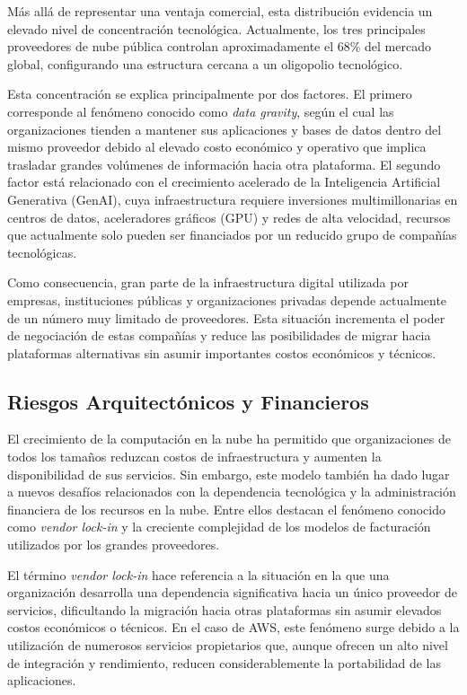 \documentclass[12pt,a4paper]{article}
\begin{document}
Más allá de representar una ventaja comercial, esta distribución evidencia un elevado nivel de concentración tecnológica. Actualmente, los tres principales proveedores de nube pública controlan aproximadamente el 68\% del mercado global, configurando una estructura cercana a un oligopolio tecnológico.\parencite{synergy2026}

Esta concentración se explica principalmente por dos factores. El primero corresponde al fenómeno conocido como \textit{data gravity}, según el cual las organizaciones tienden a mantener sus aplicaciones y bases de datos dentro del mismo proveedor debido al elevado costo económico y operativo que implica trasladar grandes volúmenes de información hacia otra plataforma. El segundo factor está relacionado con el crecimiento acelerado de la Inteligencia Artificial Generativa (GenAI), cuya infraestructura requiere inversiones multimillonarias en centros de datos, aceleradores gráficos (GPU) y redes de alta velocidad, recursos que actualmente solo pueden ser financiados por un reducido grupo de compañías tecnológicas.\parencite{synergy2026}

Como consecuencia, gran parte de la infraestructura digital utilizada por empresas, instituciones públicas y organizaciones privadas depende actualmente de un número muy limitado de proveedores. Esta situación incrementa el poder de negociación de estas compañías y reduce las posibilidades de migrar hacia plataformas alternativas sin asumir importantes costos económicos y técnicos.\parencite{cma2025}


\subsection{Riesgos Arquitectónicos y Financieros}
El crecimiento de la computación en la nube ha permitido que organizaciones de todos los tamaños reduzcan costos de infraestructura y aumenten la disponibilidad de sus servicios. Sin embargo, este modelo también ha dado lugar a nuevos desafíos relacionados con la dependencia tecnológica y la administración financiera de los recursos en la nube. Entre ellos destacan el fenómeno conocido como \textit{vendor lock-in} y la creciente complejidad de los modelos de facturación utilizados por los grandes proveedores.\parencite{cma2025}

El término \textit{vendor lock-in} hace referencia a la situación en la que una organización desarrolla una dependencia significativa hacia un único proveedor de servicios, dificultando la migración hacia otras plataformas sin asumir elevados costos económicos o técnicos. En el caso de AWS, este fenómeno surge debido a la utilización de numerosos servicios propietarios que, aunque ofrecen un alto nivel de integración y rendimiento, reducen considerablemente la portabilidad de las aplicaciones.\parencite{cma2025}
\end{document}
